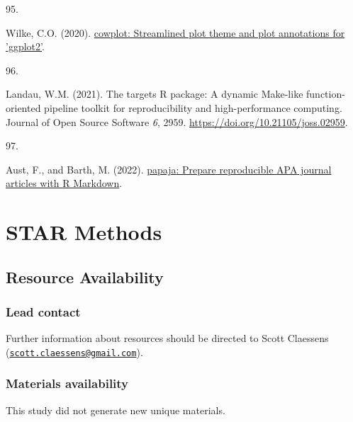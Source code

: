 \documentclass[
  man, donotrepeattitle,floatsintext]{apa6}
\newlength{\cslhangindent}
\newlength{\csllabelwidth}
\newlength{\cslentryspacingunit} %
\newenvironment{CSLReferences}[2] %
 {%
  \setlength{\parindent}{0pt}
  \ifodd #1
  \let\oldpar\par
  \def\par{\hangindent=\cslhangindent\oldpar}
  \fi
  \setlength{\parskip}{#2\cslentryspacingunit}
 }%
 {}
\newcommand{\CSLLeftMargin}[1]{\parbox[t]{\csllabelwidth}{#1}}
\newcommand{\CSLRightInline}[1]{\parbox[t]{\linewidth - \csllabelwidth}{#1}\break}
\begin{document}
\begin{CSLReferences}{0}{0}
\leavevmode{}%
\CSLLeftMargin{95. }%
\CSLRightInline{Wilke, C.O. (2020). \href{https://CRAN.R-project.org/package=cowplot}{{cowplot}: Streamlined plot theme and plot annotations for 'ggplot2'}.}

\leavevmode{}%
\CSLLeftMargin{96. }%
\CSLRightInline{Landau, W.M. (2021). The targets {R} package: A dynamic {M}ake-like function-oriented pipeline toolkit for reproducibility and high-performance computing. Journal of Open Source Software \emph{6}, 2959. \url{https://doi.org/10.21105/joss.02959}.}

\leavevmode{}%
\CSLLeftMargin{97. }%
\CSLRightInline{Aust, F., and Barth, M. (2022). \href{https://github.com/crsh/papaja}{{papaja}: {Prepare} reproducible {APA} journal articles with {R Markdown}}.}

\end{CSLReferences}

\endgroup

\newpage
\linenumbers

\hypertarget{star-methods}{%
\section{STAR Methods}\label{star-methods}}

\hypertarget{resource-availability}{%
\subsection{Resource Availability}\label{resource-availability}}

\hypertarget{lead-contact}{%
\subsubsection{Lead contact}\label{lead-contact}}

Further information about resources should be directed to Scott Claessens
(\href{mailto:scott.claessens@gmail.com}{\nolinkurl{scott.claessens@gmail.com}}).

\hypertarget{materials-availability}{%
\subsubsection{Materials availability}\label{materials-availability}}

This study did not generate new unique materials.
\end{document}
